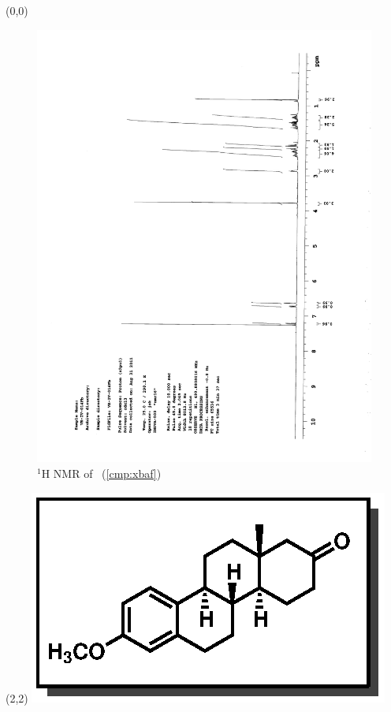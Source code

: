 \begin{textblock}{20}(0,0)
\begin{figure}[htb]
\caption{$^1$H NMR of \CMPxbaf\ (\ref{cmp:xbaf})}
\includegraphics[scale=0.75, trim = 0mm 0mm 0mm 5mm,
clip]{chp_singlecarbon/images/nmr/xbafH}
\vspace{-100pt}
\end{figure}
\end{textblock}
\begin{textblock}{1}(2,2)
\includegraphics[scale=0.8, angle=90]{chp_singlecarbon/images/xbaf}
\end{textblock}
